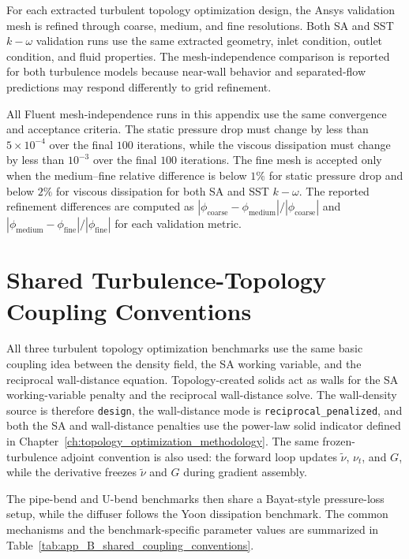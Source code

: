 For each extracted turbulent topology optimization design, the Ansys validation mesh is refined through coarse, medium, and fine resolutions. Both SA and SST $k-\omega$ validation runs use the same extracted geometry, inlet condition, outlet condition, and fluid properties. The mesh-independence comparison is reported for both turbulence models because near-wall behavior and separated-flow predictions may respond differently to grid refinement.

All Fluent mesh-independence runs in this appendix use the same convergence and acceptance criteria. The static pressure drop must change by less than $5\times10^{-4}$ over the final $100$ iterations, while the viscous dissipation must change by less than $10^{-3}$ over the final $100$ iterations. The fine mesh is accepted only when the medium--fine relative difference is below $1\%$ for static pressure drop and below $2\%$ for viscous dissipation for both SA and SST $k-\omega$. The reported refinement differences are computed as $|\phi_{\mathrm{coarse}}-\phi_{\mathrm{medium}}|/|\phi_{\mathrm{coarse}}|$ and $|\phi_{\mathrm{medium}}-\phi_{\mathrm{fine}}|/|\phi_{\mathrm{fine}}|$ for each validation metric.

\section{Shared Turbulence-Topology Coupling Conventions}
\label{sec:app_B_shared_coupling_conventions}
All three turbulent topology optimization benchmarks use the same basic coupling idea between the density field, the SA working variable, and the reciprocal wall-distance equation. Topology-created solids act as walls for the SA working-variable penalty and the reciprocal wall-distance solve. The wall-density source is therefore \texttt{design}, the wall-distance mode is \texttt{reciprocal\_penalized}, and both the SA and wall-distance penalties use the power-law solid indicator defined in Chapter~\ref{ch:topology_optimization_methodology}. The same frozen-turbulence adjoint convention is also used: the forward loop updates $\tilde{\nu}$, $\nu_t$, and $G$, while the derivative freezes $\tilde{\nu}$ and $G$ during gradient assembly.

The pipe-bend and U-bend benchmarks then share a Bayat-style pressure-loss setup, while the diffuser follows the Yoon dissipation benchmark. The common mechanisms and the benchmark-specific parameter values are summarized in Table~\ref{tab:app_B_shared_coupling_conventions}.

